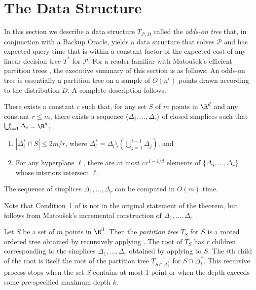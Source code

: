 \documentclass{patmorin}
\begin{document}
\section{The Data Structure}

In this section we describe a data structure $T_{\mathcal{P},D}$ called
the \emph{odds-on tree} that, in conjunction with a Backup Oracle, yields
a data structure that solves $\mathcal{P}$ and has expected query time
that is within a constant factor of the expected cost of any linear
decision tree $T^*$ for $\mathcal{P}$.   For a reader familiar with
Matou\v{s}ek's efficient partition trees \cite{m92},  the executive
summary of this section is as follows: An odds-on tree is essentially
a partition tree on a sample of $O(n^\epsilon)$ points drawn according
to the distribution $D$.  A complete description follows.

\begin{thm}[Matou\v{s}ek 1992]
There exists a constant $c$ such that, for any set $S$ of $m$
points in $\R^d$ and any constant $r\le m$, there exists a sequence
$\langle \Delta_1,\ldots,\Delta_r\rangle$ of closed simplices such that
$\bigcup_{i=1}^r \Delta_i = \R^d$,
  \begin{enumerate}
    \item $|\Delta_i^*\cap S| \le 2m/r$, where $\Delta_i^*=\Delta_i\setminus
    \left(\bigcup_{j=1}^{i-1}\Delta_j\right)$, and
    \item For any hyperplane $\ell$, there are at most $cr^{1-1/d}$ elements of
  $\{\Delta_1,\ldots,\Delta_r\}$ whose interiors intersect $\ell$.
  \end{enumerate}
  The sequence of simplices $\Delta_1,\ldots,\Delta_r$ can be computed
  in $O(m)$ time.
\end{thm}

Note that Condition~1 of  is not in the original
statement of the theorem, but follows from Matou\v{s}ek's incremental
construction of $\Delta_1,\ldots,\Delta_r$ \cite{m92}.



Let $S$ be a set of $m$ points in $\R^d$. Then the \emph{partition
tree} $T_S$ for $S$ is a rooted ordered tree obtained by recursively
applying .  The root of $T_S$ has $r$ children
corresponding to the simplices $\Delta_1,\ldots,\Delta_{r}$ obtained
by applying  to $S$. The $i$th child of the
root is itself the root of the partition tree $T_{S\cap\Delta_i^*}$
for $S\cap\Delta_i^*$. This recursive process stops when the set $S$
contains at most 1 point or when the depth exceeds some pre-specified
maximum depth $k$.
\end{document}
